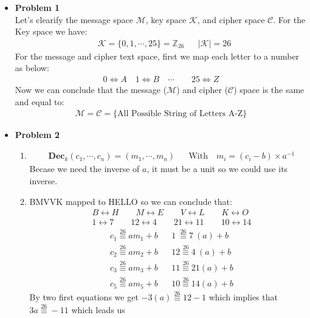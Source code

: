 \documentclass{article}
\newcommand{\ev}[1]{\stackrel{#1}{\equiv}}
\begin{document}
\begin{itemize}
	\item{\textcolor{for}{\textbf{Problem 1}}}\\
		Let's clearify the message space $\mathcal{M}$, key space $\mathcal{K}$, and cipher space $\mathcal{C}$.
		For the Key space we have:
		\begin{align*}
			&\mathcal{K} = \{ 0, 1, \cdots, 25\} = \mathbb{Z}_{26}
			&&|\mathcal{K}| = 26
		\end{align*}
		For the message and cipher text space, first we map each letter to a number as below:
		\begin{align*}
			0\iff A \quad 1\iff B \quad \cdots \quad \quad 25\iff Z
		\end{align*}
		Now we can conclude that the message ($\mathcal{M}$) and cipher ($\mathcal{C}$) space is the same and equal to:
		\begin{align*}
			\mathcal{M} = \mathcal{C} = \{ \text{All Possible String of Letters A-Z} \}
		\end{align*}
	\item{\textcolor{for}{\textbf{Problem 2}}}
		\begin{enumerate}[label=(\alph*)]
			\item
				\begin{align*}
					&\mathbf{Dec}_{k}(c_1,\cdots,c_n) = (m_1,\cdots,m_n)
					&&\text{With} \quad m_i = (c_i - b)\times a^{-1}
				\end{align*}
			Becase we need the inverse of $a$, it must be a unit so we could use its inverse.
			\item
			BMVVK mapped to HELLO so we can conclude that:
			\begin{align*}
				&
				B  \longleftrightarrow H \qquad
				M  \longleftrightarrow E \qquad
				V  \longleftrightarrow L \qquad
				K  \longleftrightarrow O \\
				&
				1  \longleftrightarrow 7 \qquad
				12 \longleftrightarrow 4 \qquad
				21 \longleftrightarrow 11 \qquad
				10 \longleftrightarrow 14 
			\end{align*}
			\begin{align*}
				&c_1 \ev{26} a m_1 + b && 1\ \ev{26}  7\  (a) + b \\
				&c_2 \ev{26} a m_2 + b && 12 \ev{26} 4\  (a) + b \\
				&c_3 \ev{26} a m_3 + b && 11 \ev{26} 21 (a) + b \\
				&c_5 \ev{26} a m_5 + b && 10 \ev{26} 14 (a) + b
			\end{align*}
			By two first equations we get $-3(a) \ev{26} 12 - 1$ which implies that $3a \ev{26} -11$ which leads us

\end{enumerate}
\end{itemize}
\end{document}
